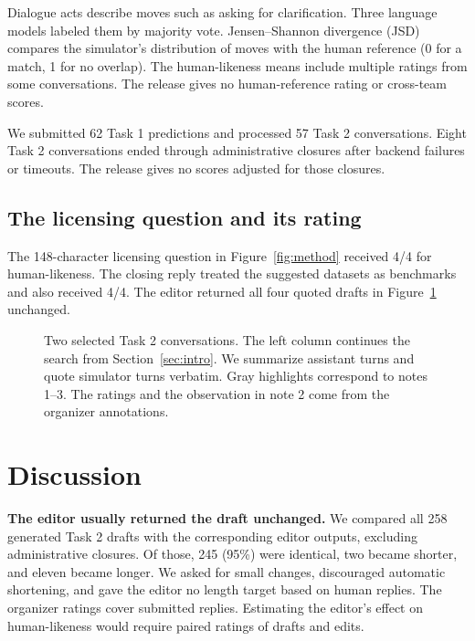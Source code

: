 \documentclass[11pt,letterpaper]{article}
\begin{document}
Dialogue acts describe moves such as asking for clarification. Three language models labeled them by majority vote. Jensen--Shannon divergence (JSD) compares the simulator's distribution of moves with the human reference (0 for a match, 1 for no overlap). The human-likeness means include multiple ratings from some conversations. The release gives no human-reference rating or cross-team scores.

We submitted 62 Task 1 predictions and processed 57 Task 2 conversations. Eight Task 2 conversations ended through administrative closures after backend failures or timeouts. The release gives no scores adjusted for those closures.

\clearpage
\subsection{The licensing question and its rating}

The 148-character licensing question in Figure~\ref{fig:method} received 4/4 for human-likeness. The closing reply treated the suggested datasets as benchmarks and also received 4/4. The editor returned all four quoted drafts in Figure~\ref{fig:comparison} unchanged.

\begin{figure}[H]\centering
\setlength{\abovecaptionskip}{7pt}

\caption{Two selected Task 2 conversations. The left column continues the search from Section~\ref{sec:intro}. We summarize assistant turns and quote simulator turns verbatim. Gray highlights correspond to notes 1--3. The ratings and the observation in note 2 come from the organizer annotations.}\label{fig:comparison}
\end{figure}

\section{Discussion}\label{sec:gaps}

\textbf{The editor usually returned the draft unchanged.} We compared all 258 generated Task 2 drafts with the corresponding editor outputs, excluding administrative closures. Of those, 245 (95\%) were identical, two became shorter, and eleven became longer. We asked for small changes, discouraged automatic shortening, and gave the editor no length target based on human replies. The organizer ratings cover submitted replies. Estimating the editor's effect on human-likeness would require paired ratings of drafts and edits.
\end{document}
